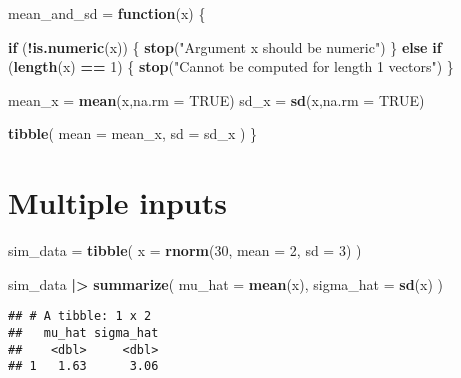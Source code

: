 \documentclass[
]{article}
\newenvironment{Shaded}{\begin{snugshade}}{\end{snugshade}}
\newcommand{\AttributeTok}[1]{\textcolor[rgb]{0.13,0.29,0.53}{#1}}
\newcommand{\ConstantTok}[1]{\textcolor[rgb]{0.56,0.35,0.01}{#1}}
\newcommand{\ControlFlowTok}[1]{\textcolor[rgb]{0.13,0.29,0.53}{\textbf{#1}}}
\newcommand{\DecValTok}[1]{\textcolor[rgb]{0.00,0.00,0.81}{#1}}
\newcommand{\FunctionTok}[1]{\textcolor[rgb]{0.13,0.29,0.53}{\textbf{#1}}}
\newcommand{\NormalTok}[1]{#1}
\newcommand{\OtherTok}[1]{\textcolor[rgb]{0.56,0.35,0.01}{#1}}
\newcommand{\SpecialCharTok}[1]{\textcolor[rgb]{0.81,0.36,0.00}{\textbf{#1}}}
\newcommand{\StringTok}[1]{\textcolor[rgb]{0.31,0.60,0.02}{#1}}
\begin{document}
\begin{Shaded}
\begin{Highlighting}[]
\NormalTok{mean\_and\_sd }\OtherTok{=} \ControlFlowTok{function}\NormalTok{(x) \{}
  
  \ControlFlowTok{if}\NormalTok{ (}\SpecialCharTok{!}\FunctionTok{is.numeric}\NormalTok{(x)) \{}
    \FunctionTok{stop}\NormalTok{(}\StringTok{"Argument x should be numeric"}\NormalTok{)}
\NormalTok{  \} }\ControlFlowTok{else} \ControlFlowTok{if}\NormalTok{ (}\FunctionTok{length}\NormalTok{(x) }\SpecialCharTok{==} \DecValTok{1}\NormalTok{) \{}
    \FunctionTok{stop}\NormalTok{(}\StringTok{"Cannot be computed for length 1 vectors"}\NormalTok{)}
\NormalTok{  \}}
  
\NormalTok{  mean\_x }\OtherTok{=} \FunctionTok{mean}\NormalTok{(x,}\AttributeTok{na.rm =} \ConstantTok{TRUE}\NormalTok{)}
\NormalTok{  sd\_x }\OtherTok{=} \FunctionTok{sd}\NormalTok{(x,}\AttributeTok{na.rm =} \ConstantTok{TRUE}\NormalTok{)}

  \FunctionTok{tibble}\NormalTok{(}
    \AttributeTok{mean =}\NormalTok{ mean\_x, }
    \AttributeTok{sd =}\NormalTok{ sd\_x}
\NormalTok{  )}
\NormalTok{\}}
\end{Highlighting}
\end{Shaded}

\section{Multiple inputs}\label{multiple-inputs}

\begin{Shaded}
\begin{Highlighting}[]
\NormalTok{sim\_data }\OtherTok{=} \FunctionTok{tibble}\NormalTok{(}
  \AttributeTok{x =} \FunctionTok{rnorm}\NormalTok{(}\DecValTok{30}\NormalTok{, }\AttributeTok{mean =} \DecValTok{2}\NormalTok{, }\AttributeTok{sd =} \DecValTok{3}\NormalTok{)}
\NormalTok{)}

\NormalTok{sim\_data }\SpecialCharTok{|\textgreater{}} 
  \FunctionTok{summarize}\NormalTok{(}
    \AttributeTok{mu\_hat =} \FunctionTok{mean}\NormalTok{(x),}
    \AttributeTok{sigma\_hat =} \FunctionTok{sd}\NormalTok{(x)}
\NormalTok{  )}
\end{Highlighting}
\end{Shaded}

\begin{verbatim}
## # A tibble: 1 x 2
##   mu_hat sigma_hat
##    <dbl>     <dbl>
## 1   1.63      3.06
\end{verbatim}
\end{document}
